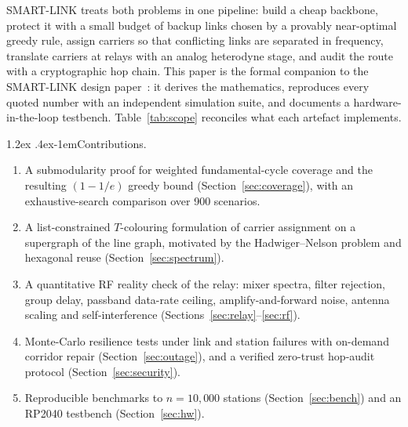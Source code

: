 \documentclass[10pt,a4paper]{article}
\makeatletter
\renewcommand\paragraph{\@startsection{paragraph}{4}{\z@}%
  {1.2ex \@plus .4ex}{-1em}{\normalfont\normalsize\itshape}}
\makeatother
\begin{document}
SMART-LINK treats both problems in one pipeline: build a cheap backbone, protect it with a small budget of
backup links chosen by a provably near-optimal greedy rule, assign carriers so that conflicting links are
separated in frequency, translate carriers at relays with an analog heterodyne stage, and audit the route with a
cryptographic hop chain. This paper is the formal companion to the SMART-LINK design paper~\cite{smartlink}: it
derives the mathematics, reproduces every quoted number with an independent simulation suite, and documents a
hardware-in-the-loop testbench. Table~\ref{tab:scope} reconciles what each artefact implements.

\paragraph{Contributions.}
\begin{enumerate}\setlength\itemsep{1pt}
  \item A submodularity proof for weighted fundamental-cycle coverage and the resulting $(1-1/e)$ greedy bound
        (Section~\ref{sec:coverage}), with an exhaustive-search comparison over 900 scenarios.
  \item A list-constrained $T$-colouring formulation of carrier assignment on a supergraph of the line graph,
        motivated by the Hadwiger--Nelson problem and hexagonal reuse (Section~\ref{sec:spectrum}).
  \item A quantitative RF reality check of the relay: mixer spectra, filter rejection, group delay, passband
        data-rate ceiling, amplify-and-forward noise, antenna scaling and self-interference
        (Sections~\ref{sec:relay}--\ref{sec:rf}).
  \item Monte-Carlo resilience tests under link and station failures with on-demand corridor repair
        (Section~\ref{sec:outage}), and a verified zero-trust hop-audit protocol (Section~\ref{sec:security}).
  \item Reproducible benchmarks to $n=10{,}000$ stations (Section~\ref{sec:bench}) and an RP2040 testbench
        (Section~\ref{sec:hw}).
\end{enumerate}
\end{document}
